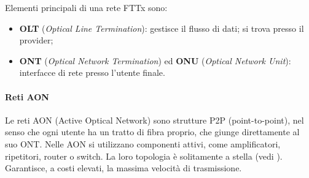 \documentclass[a4paper, twoside]{article}
\def\vedi#1{\nameref{#1}}
\begin{document}
Elementi principali di una rete FTTx sono:
\begin{itemize}
\item \textbf{OLT} (\textit{Optical Line Termination}): gestisce il flusso di dati; si trova presso il provider;
\item \textbf{ONT} (\textit{Optical Network Termination}) ed \textbf{ONU} (\textit{Optical Network Unit}): interfacce di rete presso l'utente finale.
\end{itemize}
\paragraph{Reti AON} Le reti AON (Active Optical Network) sono strutture P2P (point-to-point), nel senso che ogni utente ha un tratto di fibra proprio, che giunge direttamente al suo ONT. Nelle AON si utilizzano componenti attivi, come amplificatori, ripetitori, router o switch. La loro topologia è solitamente a stella (vedi \vedi{Rete a stella}). Garantisce, a costi elevati, la massima velocità di trasmissione.
\end{document}
